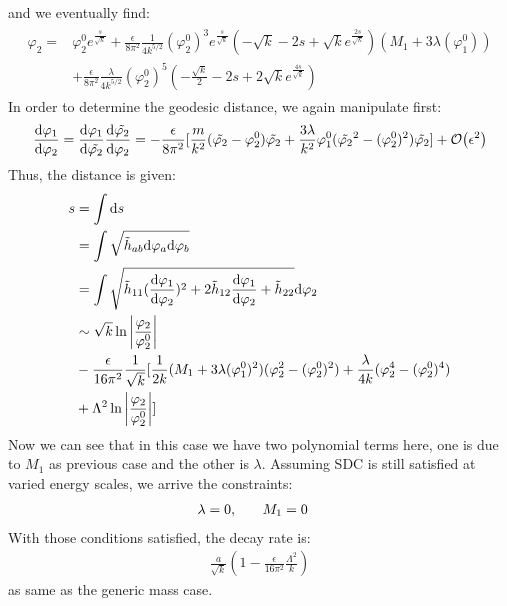 and we eventually find:
\begin{align}
    \begin{split}
        \varphi_{2}  = & \varphi_{2} ^{0} e^{\frac{s}{\sqrt{k}}} + \frac{\epsilon}{8\pi^{2}}\frac{1}{4k^{5/2}}(\varphi_{2}^{0})^{3} e^{\frac{s}{\sqrt{k}}} (-\sqrt{k} - 2s + \sqrt{k} e^{\frac{2s}{\sqrt{k}}})(M_{1} + 3\lambda (\varphi_{1}^{0})) \\
        & + \frac{\epsilon}{8\pi^{2}} \frac{\lambda}{4k^{5/2}} (\varphi_{2}^{0})^{5} (-\frac{\sqrt{k}}{2} - 2s + 2\sqrt{k}e^{\frac{4s}{\sqrt{k}}})
    \end{split}
\end{align}
In order to determine the geodesic distance, we again manipulate first:
\begin{align}
    \dv{\varphi_{1}}{\varphi_{2}} = \dv{\varphi_{1}}{\tilde{\varphi_{2}}}\dv{\tilde{\varphi_{2}}}{\varphi_{2}} = -\frac{\epsilon}{8\pi^{2}}[\frac{m}{k^{2}}(\tilde{\varphi_{2}} - \varphi_{2}^{0})\tilde{\varphi_{2}} + \frac{3\lambda}{k^{2}}\varphi_{1}^{0} (\tilde{\varphi_{2}}^{2} - (\varphi_{2}^{0})^{2})\tilde{\varphi_{2}}] + \order{\epsilon ^{2}} 
\end{align}
Thus, the distance is given:
\begin{align}
    \begin{split}
    s &= \int \dd s \\
    &= \int \sqrt{\tilde{h}_{ab} \dd \varphi_{a} \dd \varphi_{b}} \\
    &= \int \sqrt{\tilde h_{11} (\dv{\varphi_{1}}{\varphi_{2}})^{2} + 2\tilde h_{12} \dv{\varphi_{1}}{\varphi_{2}} + \tilde h_{22} } \dd \varphi_{2} \\
    & \sim \sqrt{k}\ln \abs{\frac{\varphi_{2}}{\varphi_{2}^{0}}} \\
    &- \frac{\epsilon}{16\pi^{2}}\frac{1}{\sqrt{k}} [\frac{1}{2k}(M_{1}+3\lambda(\varphi_{1}^{0})^{2})(\varphi_{2}^{2} - (\varphi_{2}^{0})^{2}) + \frac{\lambda}{4k} (\varphi_{2}^{4} - (\varphi_{2}^{0})^{4}) \\
    & + \Lambda^{2} \ln \abs{\frac{\varphi_{2}}{\varphi_{2}^{0}}}]
    \end{split}
\end{align}
Now we can see that in this case we have two polynomial terms here, one is due to $M_{1}$ as previous case and the other is $\lambda$. Assuming SDC is still satisfied at varied energy scales, we arrive the constraints:
\begin{align}
    \lambda = 0, & \qq{} M_{1} = 0
\end{align}
With those conditions satisfied, the decay rate is:
\begin{align}
    \frac{a}{\sqrt{k}} (1- \frac{\epsilon}{16\pi^{2}} \frac{\Lambda ^{2}}{k})
\end{align}
as same as the generic mass case.

